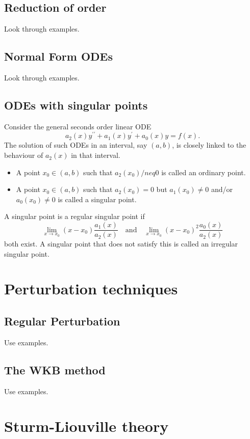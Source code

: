 \documentclass{article}
\begin{document}
\subsection{Reduction of order}
Look through examples.

\subsection{Normal Form ODEs}
Look through examples.

\subsection{ODEs with singular points}
Consider the general seconds order linear ODE
\begin{equation}
    a_2(x)y^{\prime\prime}+a_1(x)y^\prime + a_0(x)y = f(x).
\end{equation}
The solution of such ODEs in an interval, say $(a,b)$, is closely linked to the behaviour of $a_2(x)$ in that interval.
\begin{itemize}
    \item A point $x_0\in(a,b)$ such that $a_2(x_0)/neq 0$ is called an ordinary point.
    \item A point $x_0\in(a,b)$ such that $a_2(x_0) = 0$ but $a_1(x_0)\neq 0$ and/or $a_0(x_0)\neq 0$ is called a singular point.
\end{itemize}
A singular point is a regular singular point if
\begin{equation}
    \lim_{x\to x_0}(x-x_0)\frac{a_1(x)}{a_2(x)}\quad \text{and}\quad \lim_{x\to x_0}(x-x_0)^2\frac{a_0(x)}{a_2(x)}
\end{equation}
both exist. A singular point that does not satisfy this is called an irregular singular point.

\section{Perturbation techniques}
\subsection{Regular Perturbation}
Use examples.

\subsection{The WKB method}
Use examples.

\section{Sturm-Liouville theory}
\end{document}

